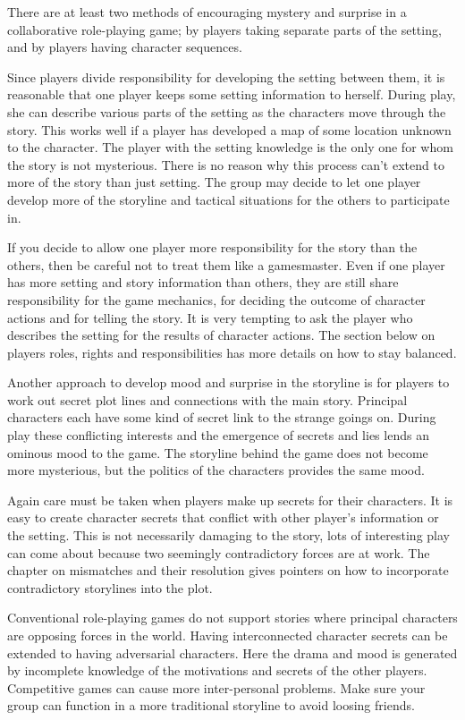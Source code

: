 \documentclass[twoside]{book}
\begin{document}
There are at least two methods of encouraging mystery and surprise in
a collaborative role-playing game; by players taking separate parts of
the setting, and by players having character sequences.

Since players divide responsibility for developing the setting between
them, it is reasonable that one player keeps some setting information
to herself. During play, she can describe various parts of the setting
as the characters move through the story. This works well if a player
has developed a map of some location unknown to the character. The
player with the setting knowledge is the only one for whom the story
is not mysterious. There is no reason why this process can't extend to
more of the story than just setting. The group may decide to let one
player develop more of the storyline and tactical situations for the
others to participate in.

If you decide to allow one player more responsibility for the story
than the others, then be careful not to treat them like a
gamesmaster. Even if one player has more setting and story information
than others, they are still share responsibility for the game
mechanics, for deciding the outcome of character actions and for
telling the story. It is very tempting to ask the player who describes
the setting for the results of character actions. The section below on
players roles, rights and responsibilities has more details on how to
stay balanced.

Another approach to develop mood and surprise in the storyline is for
players to work out secret plot lines and connections with the main
story. Principal characters each have some kind of secret link to the
strange goings on. During play these conflicting interests and the
emergence of secrets and lies lends an ominous mood to the game. The
storyline behind the game does not become more mysterious, but the
politics of the characters provides the same mood.

Again care must be taken when players make up secrets for their
characters. It is easy to create character secrets that conflict with
other player's information or the setting. This is not necessarily
damaging to the story, lots of interesting play can come about because
two seemingly contradictory forces are at work. The chapter on
mismatches and their resolution gives pointers on how to incorporate
contradictory storylines into the plot.

Conventional role-playing games do not support stories where principal
characters are opposing forces in the world. Having interconnected
character secrets can be extended to having adversarial
characters. Here the drama and mood is generated by incomplete
knowledge of the motivations and secrets of the other
players. Competitive games can cause more inter-personal
problems. Make sure your group can function in a more traditional
storyline to avoid loosing friends.
\end{document}
